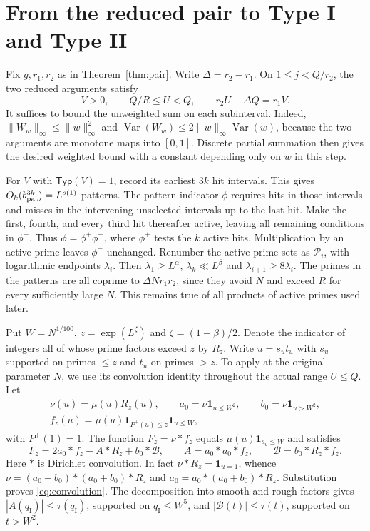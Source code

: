 \documentclass[11pt]{amsart}
\numberwithin{equation}{section}
\theoremstyle{remark}
\newcommand{\one}{\mathbf 1}
\newcommand{\Typ}{\mathsf{Typ}}
\newcommand{\Var}{\operatorname{Var}}
\begin{document}
\section{From the reduced pair to Type I and Type II}\label{sec:types}

Fix $g,r_1,r_2$ as in Theorem~\ref{thm:pair}. Write $\Delta=r_2-r_1$. On $1\le j<Q/r_2$, the two reduced arguments satisfy
\begin{equation}\label{eq:reflection}
 V>0,\qquad Q/R\le U<Q,\qquad r_2U-\Delta Q=r_1V.
\end{equation}
It suffices to bound the unweighted sum on each subinterval. Indeed,
$\|W_w\|_\infty\le\|w\|_\infty^2$ and $\Var(W_w)\le2\|w\|_\infty\Var(w)$, because the two arguments are monotone maps into $[0,1]$. Discrete partial summation then gives the desired weighted bound with a constant depending only on $w$ in this step.

For $V$ with $\Typ(V)=1$, record its earliest $3k$ hit intervals. This gives $O_k(b_{\rm pat}^{3k})=L^{o(1)}$ patterns. The pattern indicator $\phi$ requires hits in those intervals and misses in the intervening unselected intervals up to the last hit. Make the first, fourth, and every third hit thereafter active, leaving all remaining conditions in $\phi^-$. Thus $\phi=\phi^+\phi^-$, where $\phi^+$ tests the $k$ active hits. Multiplication by an active prime leaves $\phi^-$ unchanged. Renumber the active prime sets as $\mathcal P_i$, with logarithmic endpoints $\lambda_i$. Then $\lambda_1\ge L^\alpha$, $\lambda_k\ll L^\beta$ and $\lambda_{i+1}\ge8\lambda_i$. The primes in the patterns are all coprime to $\Delta N r_1r_2$, since they avoid $N$ and exceed $R$ for every sufficiently large $N$. This remains true of all products of active primes used later.

Put $W=N^{1/100}$, $z=\exp(L^\zeta)$ and $\zeta=(1+\beta)/2$. Denote the indicator of integers all of whose prime factors exceed $z$ by $R_z$. Write $u=s_u t_u$ with $s_u$ supported on primes $\le z$ and $t_u$ on primes $>z$. To apply \cite[Proposition~5.2]{Lichtman} at the original parameter $N$, we use its convolution identity throughout the actual range $U\le Q$. Let
\[
 \begin{gathered}
 \nu(u)=\mu(u)R_z(u),\qquad
 a_0=\nu\one_{u\le W^2},\qquad b_0=\nu\one_{u>W^2},\\
 f_z(u)=\mu(u)\one_{P^+(u)\le z}\one_{u\le W},
 \end{gathered}
\]
with $P^+(1)=1$. The function $F_z=\nu*f_z$ equals $\mu(u)\one_{s_u\le W}$ and satisfies
\begin{equation}\label{eq:convolution}
 F_z=2a_0*f_z - A*R_z+b_0*\mathcal B,
 \qquad A=a_0*a_0*f_z,\qquad \mathcal B=b_0*R_z*f_z.
\end{equation}
Here $*$ is Dirichlet convolution. In fact $\nu*R_z=\one_{u=1}$, whence $\nu=(a_0+b_0)*(a_0+b_0)*R_z$ and $a_0=a_0*(a_0+b_0)*R_z$. Substitution proves \eqref{eq:convolution}. The decomposition into smooth and rough factors gives $|A(q_{\mathrm I})|\le\tau(q_{\mathrm I})$, supported on $q_{\mathrm I}\le W^5$, and $|\mathcal B(t)|\le\tau(t)$, supported on $t>W^2$.
\end{document}
